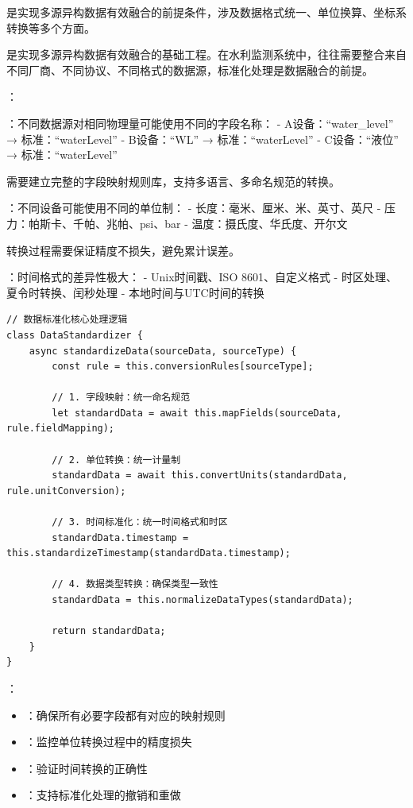 是实现多源异构数据有效融合的前提条件，涉及数据格式统一、单位换算、坐标系转换等多个方面。

是实现多源异构数据有效融合的基础工程。在水利监测系统中，往往需要整合来自不同厂商、不同协议、不同格式的数据源，标准化处理是数据融合的前提。

：

：不同数据源对相同物理量可能使用不同的字段名称： - A设备：``water\_level'' → 标准：``waterLevel'' - B设备：``WL'' → 标准：``waterLevel'' - C设备：``液位'' → 标准：``waterLevel''

需要建立完整的字段映射规则库，支持多语言、多命名规范的转换。

：不同设备可能使用不同的单位制： - 长度：毫米、厘米、米、英寸、英尺 - 压力：帕斯卡、千帕、兆帕、psi、bar - 温度：摄氏度、华氏度、开尔文

转换过程需要保证精度不损失，避免累计误差。

：时间格式的差异性极大： - Unix时间戳、ISO 8601、自定义格式 - 时区处理、夏令时转换、闰秒处理 - 本地时间与UTC时间的转换

\begin{lstlisting}[style=javascript]
// 数据标准化核心处理逻辑
class DataStandardizer {
    async standardizeData(sourceData, sourceType) {
        const rule = this.conversionRules[sourceType];
        
        // 1. 字段映射：统一命名规范
        let standardData = await this.mapFields(sourceData, rule.fieldMapping);
        
        // 2. 单位转换：统一计量制
        standardData = await this.convertUnits(standardData, rule.unitConversion);
        
        // 3. 时间标准化：统一时间格式和时区
        standardData.timestamp = this.standardizeTimestamp(standardData.timestamp);
        
        // 4. 数据类型转换：确保类型一致性
        standardData = this.normalizeDataTypes(standardData);
        
        return standardData;
    }
}
\end{lstlisting}

：

\begin{itemize}
\tightlist
\item
  ：确保所有必要字段都有对应的映射规则
\item
  ：监控单位转换过程中的精度损失
\item
  ：验证时间转换的正确性
\item
  ：支持标准化处理的撤销和重做
\end{itemize}

